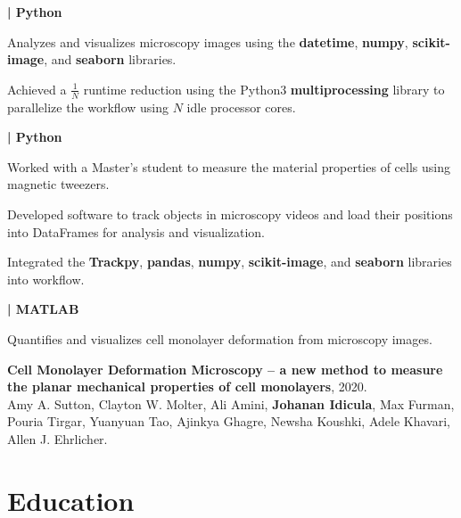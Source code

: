 \documentclass[]{jidicula-resume}
\begin{document}
\textbf{| Python}
\begin{tightemize}
\item Analyzes and visualizes microscopy images using the \textbf{datetime},
  \textbf{numpy}, \textbf{scikit-image}, and \textbf{seaborn} libraries.
\item Achieved a $\frac{1}{N}$ runtime reduction using the Python3 \textbf{multiprocessing} library to parallelize the workflow using $N$ idle processor cores.
\end{tightemize}
\sectionsep
{}
\textbf{| Python}
\begin{tightemize}
  
\item Worked with a Master's student to measure the material properties of cells using magnetic tweezers.

\item Developed software to track objects in microscopy videos and load their
  positions into DataFrames for analysis and visualization.
\item Integrated the \textbf{Trackpy}, \textbf{pandas}, \textbf{numpy},
  \textbf{scikit-image}, and \textbf{seaborn} libraries into workflow.
\end{tightemize}
\sectionsep
{}
\textbf{| MATLAB}
\begin{tightemize}
\item Quantifies and visualizes cell monolayer deformation from microscopy
  images.
\item \textbf{Cell Monolayer Deformation Microscopy – a new method to
    measure the planar mechanical properties of cell monolayers}, 2020.\\
  Amy A. Sutton, Clayton W. Molter, Ali Amini, \textbf{Johanan Idicula},
  Max Furman, Pouria Tirgar, Yuanyuan Tao, Ajinkya Ghagre, Newsha Koushki, Adele Khavari, Allen J. Ehrlicher.

\end{tightemize}
\sectionsep

\section{Education}
\sectionsep
\end{document}
